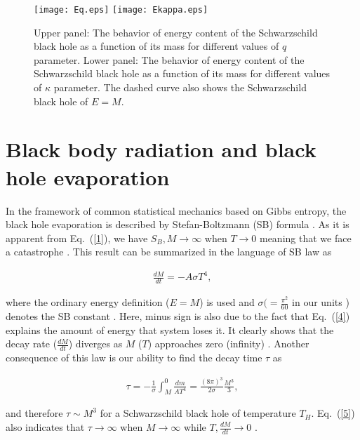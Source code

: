 \documentclass[twocolumn,preprintnumbers,amsmath,nofootinbib,amssymb]{revtex4}
\begin{document}
\begin{figure}
    \begin{center}
        \texttt{[image: Eq.eps]}
        \texttt{[image: Ekappa.eps]}
        \caption{Upper panel: The behavior of energy content of the Schwarzschild black hole as a function of its mass for different values of $q$ parameter. Lower panel: The behavior of energy content of the Schwarzschild black hole as a function of its mass for different values of $\kappa$ parameter. The dashed curve also shows the Schwarzschild black hole of $E=M$.}\label{fig1}
    \end{center}
\end{figure}


\section{Black body radiation and black hole evaporation}

In the framework of common statistical mechanics based on Gibbs
entropy, the black hole evaporation is described by
Stefan-Boltzmann (SB) formula \cite{cav,ali}. As it is apparent
from Eq.~(\ref{1}), we have $S_B,M\rightarrow\infty$ when
$T\rightarrow0$ meaning that we face a catastrophe \cite{ali}.
This result can be summarized in the language of SB law as

\begin{eqnarray}\label{4}
\frac{dM}{dt}=-A\sigma T^4,
\end{eqnarray}

\noindent where the ordinary energy definition ($E=M$) is used and
$\sigma(=\frac{\pi^2}{60}$ in our units \cite{kanbb1,kelly})
denotes the SB constant \cite{ali}. Here, minus sign is also due
to the fact that Eq.~(\ref{4}) explains the amount of energy that
system loses it. It clearly shows that the decay rate
($\frac{dM}{dt}$) diverges as $M$ ($T$) approaches zero (infinity)
\cite{ali}. Another consequence of this law is our ability to find
the decay time $\tau$ as

\begin{eqnarray}\label{5}
\tau=-\frac{1}{\sigma}\int_{M}^0\frac{dm}{AT^4}=\frac{(8\pi)^3}{2\sigma}\frac{M^3}{3},
\end{eqnarray}

\noindent and therefore $\tau\sim M^3$ for a Schwarzschild black
hole of temperature $T_H$. Eq.~(\ref{5}) also indicates that
$\tau\rightarrow\infty$ when $M\rightarrow\infty$ while
$T,\frac{dM}{dt}\rightarrow0$ \cite{ali}.
\end{document}
